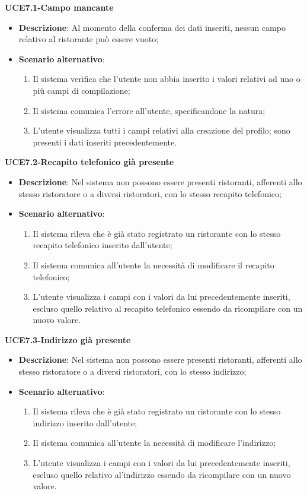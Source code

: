 \textbf{UCE7.1-Campo mancante}

\begin{itemize}
\item \textbf{Descrizione}: Al momento della conferma dei dati inseriti, nessun campo relativo al ristorante può essere vuoto;
\item \textbf{Scenario alternativo}:
\begin{enumerate}
\item Il sistema verifica che l'utente non abbia inserito i valori relativi ad uno o più campi di compilazione;
\item Il sistema comunica l'errore all'utente, specificandone la natura;
\item L'utente visualizza tutti i campi relativi alla creazione del profilo; sono presenti i dati inseriti precedentemente.
\end{enumerate}
\end{itemize}

\textbf{UCE7.2-Recapito telefonico già presente}

\begin{itemize}
\item \textbf{Descrizione}: Nel sistema non possono essere presenti ristoranti, afferenti allo stesso ristoratore o a diversi ristoratori, con lo stesso recapito telefonico;
\item \textbf{Scenario alternativo}:
\begin{enumerate}
\item Il sistema rileva che è già stato registrato un ristorante con lo stesso recapito telefonico inserito dall'utente;
\item Il sistema comunica all'utente la necessità di modificare il recapito telefonico;
\item L'utente visualizza i campi con i valori da lui precedentemente inseriti, escluso quello relativo al recapito telefonico essendo da ricompilare con un nuovo valore.
\end{enumerate}
\end{itemize}

\textbf{UCE7.3-Indirizzo già presente}

\begin{itemize}
\item \textbf{Descrizione}: Nel sistema non possono essere presenti ristoranti, afferenti allo stesso ristoratore o a diversi ristoratori, con lo stesso indirizzo;
\item \textbf{Scenario alternativo}:
\begin{enumerate}
\item Il sistema rileva che è già stato registrato un ristorante con lo stesso indirizzo inserito dall'utente;
\item Il sistema comunica all'utente la necessità di modificare l'indirizzo;
\item L'utente visualizza i campi con i valori da lui precedentemente inseriti, escluso quello relativo al'indirizzo essendo da ricompilare con un nuovo valore.
\end{enumerate}
\end{itemize}

